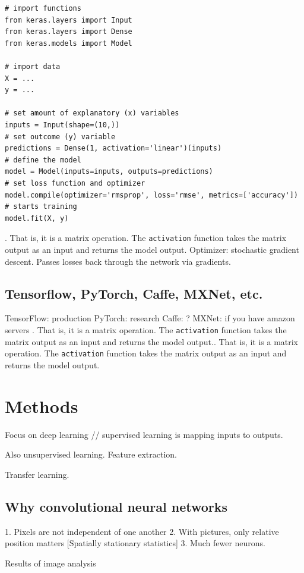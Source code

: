 \documentclass[12pt, a4paper, oneside, headinclude, footinclude]{article}
\begin{document}
\begin{verbatim}
# import functions
from keras.layers import Input
from keras.layers import Dense
from keras.models import Model

# import data
X = ...
y = ...

# set amount of explanatory (x) variables 
inputs = Input(shape=(10,))
# set outcome (y) variable
predictions = Dense(1, activation='linear')(inputs)
# define the model
model = Model(inputs=inputs, outputs=predictions)
# set loss function and optimizer
model.compile(optimizer='rmsprop', loss='rmse', metrics=['accuracy'])
# starts training
model.fit(X, y)  
\end{verbatim}

. That is, it is a matrix operation. The
\texttt{activation} function takes the matrix output as an input and returns
the model output.
Optimizer: stochastic gradient descent. Passes losses back through the network
via gradients.

\subsection{Tensorflow, PyTorch, Caffe, MXNet, etc.}

TensorFlow: production
PyTorch: research
Caffe: ?
MXNet: if you have amazon servers
. That is, it is a matrix operation. The
\texttt{activation} function takes the matrix output as an input and returns
the model output.. That is, it is a matrix operation. The
\texttt{activation} function takes the matrix output as an input and returns
the model output.
\section{Methods}

Focus on deep learning // supervised learning is mapping inputs to outputs.

Also unsupervised learning. Feature extraction.

Transfer learning.

\subsection{Why convolutional neural networks}

1. Pixels are not independent of one another
2. With pictures, only relative position matters [Spatially stationary
statistics]
3. Much fewer neurons.

Results of image analysis
\end{document}
